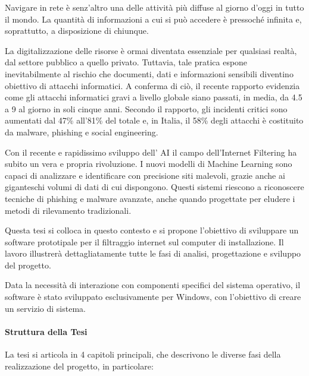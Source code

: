 \documentclass[12pt,a4paper,openright,twoside]{book}
\begin{document}
Navigare in rete è senz'altro una delle attività più diffuse al giorno d'oggi in tutto il mondo.
La quantità di informazioni a cui si può accedere è pressoché infinita e, soprattutto, a disposizione di chiunque.

La digitalizzazione delle risorse è ormai diventata essenziale per qualsiasi realtà, dal settore pubblico a quello privato.
Tuttavia, tale pratica espone inevitabilmente al rischio che documenti,
dati e informazioni sensibili diventino obiettivo di attacchi informatici.
A conferma di ciò, il recente rapporto \cite{clusit2024-sicurezza} evidenzia come gli attacchi informatici gravi a livello globale siano passati,
in media, da 4.5 a 9 al giorno in soli cinque anni.
Secondo il rapporto, gli incidenti critici sono aumentati dal 47\% all'81\% del totale e,
in Italia, il 58\% degli attacchi è costituito da malware, phishing e social engineering.

Con il recente e rapidissimo sviluppo dell' \gls{AI} il campo dell'Internet Filtering ha subito un vera e propria rivoluzione.
I nuovi modelli di Machine Learning sono capaci di analizzare e identificare con precisione siti malevoli,
grazie anche ai giganteschi volumi di dati di cui dispongono.
Questi sistemi riescono a riconoscere tecniche di phishing e malware avanzate, anche quando progettate per eludere i metodi di rilevamento tradizionali.

Questa tesi si colloca in questo contesto e si propone l'obiettivo di sviluppare un software prototipale per il filtraggio internet sul computer di installazione.
Il lavoro illustrerà dettagliatamente tutte le fasi di analisi, progettazione e sviluppo del progetto.

Data la necessità di interazione con componenti specifici del sistema operativo,
il software è stato sviluppato esclusivamente per Windows, con l'obiettivo di creare un servizio di sistema.

\paragraph{Struttura della Tesi}

La tesi si articola in 4 capitoli principali, che descrivono le diverse fasi della realizzazione del progetto, in particolare:
\end{document}
